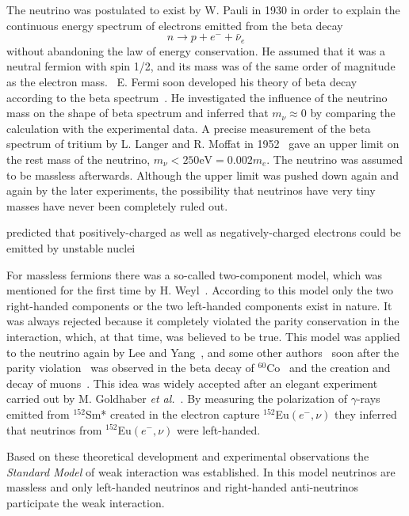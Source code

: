 The neutrino was postulated to exist by W. Pauli in 1930 in order to
explain the continuous energy spectrum of electrons emitted from the
beta decay
\begin{equation}
  \label{eq:bd}
  n \rightarrow p+e^{-}+\bar{\nu}_e
\end{equation}
without abandoning the law of energy conservation. He assumed that it
was a neutral fermion with spin 1/2, and its mass was of the same
order of magnitude as the electron mass.~\cite{Pau30} E. Fermi soon
developed his theory of beta decay according to the beta
spectrum~\cite{Fer33,Fer34}. He investigated the influence of the
neutrino mass on the shape of beta spectrum and inferred that $m_\nu
\approx 0$ by comparing the calculation with the experimental data. A
precise measurement of the beta spectrum of tritium by L. Langer and
R. Moffat in 1952~\cite{Lan52} gave an upper limit on the rest mass of
the neutrino, $m_\nu < 250 \mbox{eV} = 0.002m_e$. The neutrino was
assumed to be massless afterwards. Although the upper limit was pushed
down again and again by the later experiments, the possibility that
neutrinos have very tiny masses have never been completely ruled out.

predicted that positively-charged as well as negatively-charged
electrons could be emitted by unstable nuclei

For massless fermions there was a so-called two-component model, which
was mentioned for the first time by H. Weyl~\cite{Wey29}. According to
this model only the two right-handed components or the two left-handed
components exist in nature. It was always rejected because it
completely violated the parity conservation in the interaction, which,
at that time, was believed to be true. This model was applied to the
neutrino again by Lee and Yang~\cite{Lee57}, and some other
authors~\cite{Sal57,Lan57} soon after the parity
violation~\cite{Lee56} was observed in the beta decay of
$^{60}$Co~\cite{Wu57} and the creation and decay of
muons~\cite{Gar57,Fri57}. This idea was widely accepted after an
elegant experiment carried out by M. Goldhaber \textit{et
  al.}~\cite{Gol58}. By measuring the polarization of $\gamma$-rays
emitted from $^{152}$Sm* created in the electron capture
$^{152}$Eu$(e^-,\nu)$ they inferred that neutrinos from
$^{152}$Eu$(e^-,\nu)$ were left-handed.

Based on these theoretical development and experimental observations
the \emph{Standard Model} of weak interaction was established. In this
model neutrinos are massless and only left-handed neutrinos and
right-handed anti-neutrinos participate the weak interaction.

